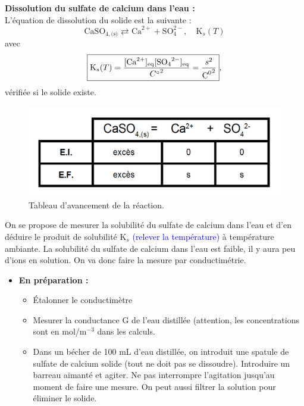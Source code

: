 \documentclass[11pt,a4paper]{report}
\begin{document}
\textbf{Dissolution du sulfate de calcium dans l'eau :}\\

L'équation de dissolution du solide est la suivante :
\begin{equation}
	\text{CaSO}_{4,\text{(s)}} \rightleftarrows \text{Ca}^{2+} + \text{SO}_4^{2-}, 
	\quad\text{K}_s(T)
\end{equation}
avec
\begin{equation}
	\boxed{\text{K}_s(T) 
	= \frac{[\text{Ca}^{2+}]_\text{eq} [{\text{SO}_4}^{2-}]_\text{eq}}{{C\degree}^2}
	= \frac{s^2}{{\text{C}^0}^2}},
\end{equation}
vérifiée si le solide existe.

\begin{figure}[h!]
	\begin{center}
  		\includegraphics[scale = 0.3]{tableau_avancement.png}
		\caption{Tableau d'avancement de la réaction.}
	\end{center}
\end{figure}

On se propose de mesurer la solubilité du sulfate de calcium dans l'eau et d'en déduire le produit de solubilité $\text{K}_s$ \textcolor{blue}{(relever la température)} à température ambiante. La solubilité du sulfate de calcium dans l'eau est faible, il y aura peu d'ions en solution. On va donc faire la mesure par conductimétrie.\\

\begin{itemize}
	\item \textbf{En préparation :}
	\begin{itemize}
		\item Étalonner le conductimètre
		\item Mesurer la conductance G de l'eau distillée (attention, les concentrations sont 
		en mol/$\text{m}^{-3}$ dans les calculs.
		\item Dans un bécher de 100 mL d'eau distillée, on introduit une spatule de sulfate de 				calcium solide (tout ne doit pas se dissoudre). Introduire un barreau aimanté et agiter. Ne 		pas interrompre l'agitation jusqu'au moment de faire une mesure. On peut aussi filtrer la 			solution pour éliminer le solide.\\
	\end{itemize}
\end{itemize}
\end{document}
